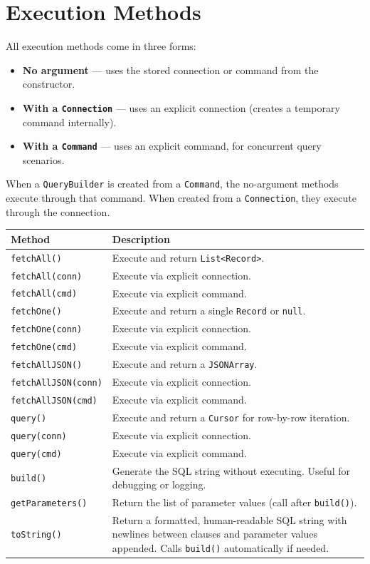 \section{Execution Methods}
\label{sec:qb-execution}

All execution methods come in three forms:

\begin{itemize}
  \item \textbf{No argument} --- uses the stored connection or command from the constructor.
  \item \textbf{With a \texttt{Connection}} --- uses an explicit connection (creates a temporary command internally).
  \item \textbf{With a \texttt{Command}} --- uses an explicit command, for concurrent query scenarios.
\end{itemize}

\noindent
When a \texttt{QueryBuilder} is created from a \texttt{Command}, the no-argument methods execute through that command.  When created from a \texttt{Connection}, they execute through the connection.

\begin{longtable}{P{4.5cm}P{6cm}}
\toprule
\textbf{Method} & \textbf{Description} \\
\midrule
\endhead
\texttt{fetchAll()} & Execute and return \texttt{List<Record>}. \\
\texttt{fetchAll(conn)} & Execute via explicit connection. \\
\texttt{fetchAll(cmd)} & Execute via explicit command. \\
\texttt{fetchOne()} & Execute and return a single \texttt{Record} or \texttt{null}. \\
\texttt{fetchOne(conn)} & Execute via explicit connection. \\
\texttt{fetchOne(cmd)} & Execute via explicit command. \\
\texttt{fetchAllJSON()} & Execute and return a \texttt{JSONArray}. \\
\texttt{fetchAllJSON(conn)} & Execute via explicit connection. \\
\texttt{fetchAllJSON(cmd)} & Execute via explicit command. \\
\texttt{query()} & Execute and return a \texttt{Cursor} for row-by-row iteration. \\
\texttt{query(conn)} & Execute via explicit connection. \\
\texttt{query(cmd)} & Execute via explicit command. \\
\texttt{build()} & Generate the SQL string without executing.  Useful for debugging or logging. \\
\texttt{getParameters()} & Return the list of parameter values (call after \texttt{build()}). \\
\texttt{toString()} & Return a formatted, human-readable SQL string with newlines between clauses and parameter values appended.  Calls \texttt{build()} automatically if needed. \\
\bottomrule
\end{longtable}


